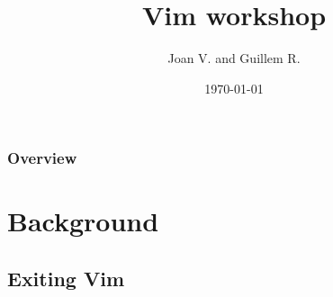\documentclass{beamer}
\title[Vim workshop]{Vim workshop}
\author{Joan V. and Guillem R.}
\institute[LinuxUPC]
{
LinuxUPC \\
\medskip
\textit{linuxupc AT linuxupc.upc.edu} 
}
\date{\today}
\begin{document}
\begin{frame}
\titlepage
\end{frame}

\begin{frame}
\frametitle{Overview} 
\tableofcontents 
\end{frame}

\section{Background}
\subsection{Exiting Vim}
\end{document}
